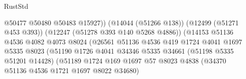 \begin{lexlean}{RustStd}
\begin{coremodule}
                                                    @50477
                                                    @50480
                                                    @50483
                                                    @15927))
                                                (@14044 (@51266 @138))
                                                (@12499 (@51271 @453 @393))
                                                (@12247 (@51278 @393 @140 @5268 @4886))
                                                (@14153
                                                  @51136
                                                  @4536
                                                  @4082
                                                  @4073
                                                  @8024
                                                  (@26561
                                                    @51136
                                                    @4536
                                                    @419
                                                    @1724
                                                    @4041
                                                    @1697
                                                    @5335
                                                    @8023
                                                    (@51190
                                                      @1726
                                                      @4041
                                                      @34346
                                                      @5335
                                                      @34661
                                                      (@51198 @5335 @51201 @14428)
                                                      (@51189
                                                        @1724
                                                        @169
                                                        @1697
                                                        @57
                                                        @8023
                                                        @4838
                                                        (@34370
                                                          @51136
                                                          @4536
                                                          @1721
                                                          @1697
                                                          @8022
                                                          @34680)

\end{coremodule}
\end{lexlean}

